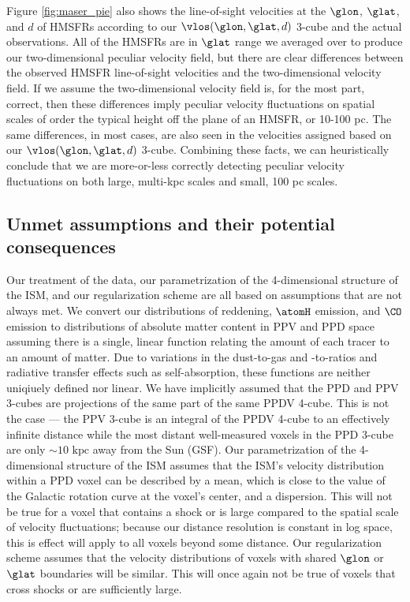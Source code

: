 Figure \ref{fig:maser_pie} also shows the line-of-sight velocities at the $\glon$, $\glat$, and $d$ of HMSFRs according to our $\vlos(\glon, \glat, d)$ 3-cube and the actual observations.
All of the HMSFRs are in $\glat$ range we averaged over to produce our two-dimensional peculiar velocity field, but there are clear differences between the observed HMSFR line-of-sight velocities and the two-dimensional velocity field. 
If we assume the two-dimensional velocity field is, for the most part, correct, then these differences imply peculiar velocity fluctuations on spatial scales of order the typical height off the plane of an HMSFR, or 10-100 pc. 
The same differences, in most cases, are also seen in the velocities assigned based on our $\vlos(\glon, \glat, d)$ 3-cube. 
Combining these facts, we can heuristically conclude that we are more-or-less correctly detecting peculiar velocity fluctuations on both large, multi-kpc scales and small, 100 pc scales. 

\subsection{Unmet assumptions and their potential consequences}
\label{sec:discussion-systematics}
Our treatment of the data, our parametrization of the 4-dimensional structure of the ISM, and our regularization scheme are all based on assumptions that are not always met.
We convert our distributions of reddening, $\atomH$ emission, and $\CO$ emission to distributions of absolute matter content in PPV and PPD space assuming there is a single, linear function relating the amount of each tracer to an amount of matter.
Due to variations in the dust-to-gas and \CO-to-\molH ratios and radiative transfer effects such as self-absorption, these functions are neither uniqiuely defined nor linear. 
We have implicitly assumed that the PPD and PPV 3-cubes are projections of the same part of the same PPDV 4-cube. 
This is not the case --- the PPV 3-cube is an integral of the PPDV 4-cube to an effectively infinite distance while the most distant well-measured voxels in the PPD 3-cube are only $\sim 10 \text{ kpc}$ away from the Sun (GSF).
Our parametrization of the 4-dimensional structure of the ISM assumes that the ISM's velocity distribution within a PPD voxel can be described by a mean, which is close to the value of the Galactic rotation curve at the voxel's center, and a dispersion.  
This will not be true for a voxel that contains a shock or is large compared to the spatial scale of velocity fluctuations; because our distance resolution is constant in log space, this is effect will apply to all voxels beyond some distance. 
Our regularization scheme assumes that the velocity distributions of voxels with shared $\glon$ or $\glat$ boundaries will be similar. 
This will once again not be true of voxels that cross shocks or are sufficiently large. 

